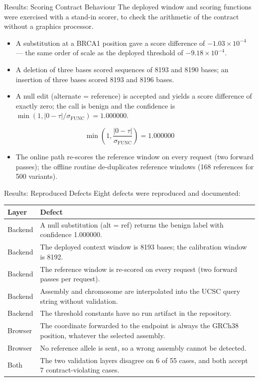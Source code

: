 \documentclass[aspectratio=169,10pt]{beamer}
\begin{document}
\begin{frame}{Results: Scoring Contract Behaviour}
The deployed window and scoring functions were exercised with a stand-in scorer, to check the arithmetic of the contract without a graphics processor.
\begin{itemize}\small
\item A substitution at a BRCA1 position gave a score difference of $-1.03\times10^{-4}$ --- the same order of scale as the deployed threshold of $-9.18\times10^{-4}$.
\item A deletion of three bases scored sequences of 8193 and 8190 bases; an insertion of three bases scored 8193 and 8196 bases.
\item A null edit (alternate = reference) is accepted and yields a score difference of exactly zero; the call is benign and the confidence is $\min(1,|0-\tau|/\sigma_{\mathrm{FUNC}})=1.000000$.
\end{itemize}
\begin{equation*}
\min\left(1,\frac{|0-\tau|}{\sigma_{\mathrm{FUNC}}}\right)=1.000000
\end{equation*}
\begin{itemize}\small
\item The online path re-scores the reference window on every request (two forward passes); the offline routine de-duplicates reference windows (168 references for 500 variants).
\end{itemize}
\end{frame}

\begin{frame}{Results: Reproduced Defects}
Eight defects were reproduced and documented:
\begin{table}
\centering
\footnotesize
\begin{tabular}{@{}p{1.6cm}p{9.5cm}@{}}
\toprule
Layer & Defect \\
\midrule
Backend & A null substitution (alt = ref) returns the benign label with confidence 1.000000. \\
Backend & The deployed context window is 8193 bases; the calibration window is 8192. \\
Backend & The reference window is re-scored on every request (two forward passes per request). \\
Backend & Assembly and chromosome are interpolated into the UCSC query string without validation. \\
Backend & The threshold constants have no run artifact in the repository. \\
Browser & The coordinate forwarded to the endpoint is always the GRCh38 position, whatever the selected assembly. \\
Browser & No reference allele is sent, so a wrong assembly cannot be detected. \\
Both & The two validation layers disagree on 6 of 55 cases, and both accept 7 contract-violating cases. \\
\bottomrule
\end{tabular}
\end{table}
\end{frame}
\end{document}
